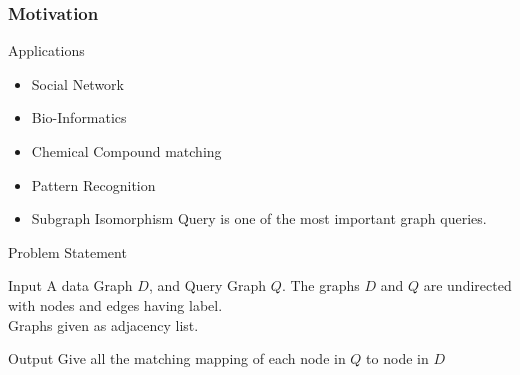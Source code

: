 \documentclass{beamer}
\begin{document}
\begin{frame}
\frametitle{Motivation}


    \begin{block}{Applications}
    \begin{itemize}
    \item Social Network
    \item Bio-Informatics
    \item Chemical Compound matching
    \item Pattern Recognition
    \end{itemize}
    \end{block}
    


    \begin{itemize}
      \item Subgraph Isomorphism Query is one of the most important graph queries.
    \end{itemize}
   


\end{frame}
\begin{frame}{Problem Statement}

\begin{block}{Input} A data Graph $D$, and Query Graph $Q$. The graphs $D$ and $Q$ are undirected with nodes and edges having label.
  \\
  Graphs given as adjacency list. 
  \\
  \end{block}
  \begin{block}{Output}
   Give all the matching mapping of each node in $Q$ to node in $D$ \\

\end{block}

    
\end{frame}
\end{document}

